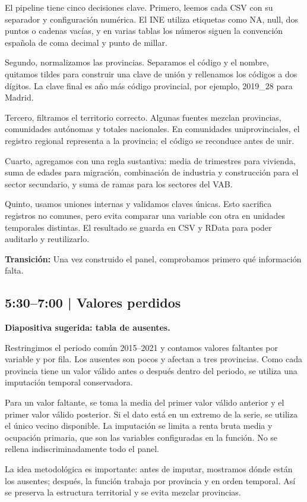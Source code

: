 \documentclass[11pt,a4paper]{article}
\begin{document}
El pipeline tiene cinco decisiones clave. Primero, leemos cada CSV con su separador y configuración numérica. El INE utiliza etiquetas como NA, null, dos puntos o cadenas vacías, y en varias tablas los números siguen la convención española de coma decimal y punto de millar.

Segundo, normalizamos las provincias. Separamos el código y el nombre, quitamos tildes para construir una clave de unión y rellenamos los códigos a dos dígitos. La clave final es año más código provincial, por ejemplo, 2019_28 para Madrid.

Tercero, filtramos el territorio correcto. Algunas fuentes mezclan provincias, comunidades autónomas y totales nacionales. En comunidades uniprovinciales, el registro regional representa a la provincia; el código se reconduce antes de unir.

Cuarto, agregamos con una regla sustantiva: media de trimestres para vivienda, suma de edades para migración, combinación de industria y construcción para el sector secundario, y suma de ramas para los sectores del VAB.

Quinto, usamos uniones internas y validamos claves únicas. Esto sacrifica registros no comunes, pero evita comparar una variable con otra en unidades temporales distintas. El resultado se guarda en CSV y RData para poder auditarlo y reutilizarlo.

\textbf{Transición:} Una vez construido el panel, comprobamos primero qué información falta.

\subsection{5:30--7:00 | Valores perdidos}
\textbf{Diapositiva sugerida: tabla de ausentes.}

Restringimos el periodo común 2015--2021 y contamos valores faltantes por variable y por fila. Los ausentes son pocos y afectan a tres provincias. Como cada provincia tiene un valor válido antes o después dentro del periodo, se utiliza una imputación temporal conservadora.

Para un valor faltante, se toma la media del primer valor válido anterior y el primer valor válido posterior. Si el dato está en un extremo de la serie, se utiliza el único vecino disponible. La imputación se limita a renta bruta media y ocupación primaria, que son las variables configuradas en la función. No se rellena indiscriminadamente todo el panel.

La idea metodológica es importante: antes de imputar, mostramos dónde están los ausentes; después, la función trabaja por provincia y en orden temporal. Así se preserva la estructura territorial y se evita mezclar provincias.
\end{document}
